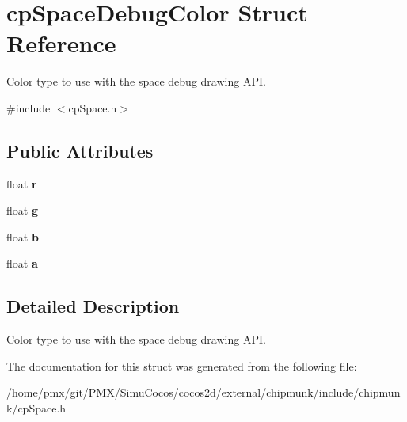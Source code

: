 \hypertarget{structcpSpaceDebugColor}{}\section{cp\+Space\+Debug\+Color Struct Reference}
\label{structcpSpaceDebugColor}


Color type to use with the space debug drawing A\+PI.  




{\ttfamily \#include $<$cp\+Space.\+h$>$}

\subsection*{Public Attributes}
\begin{DoxyCompactItemize}
\item 
\mbox{\label{structcpSpaceDebugColor_a8363abb3839ece1a2ea672e15054c31d}} 
float {\bfseries r}
\item 
\mbox{\label{structcpSpaceDebugColor_a842d9ced4b2d71df6de850c5c6580ef0}} 
float {\bfseries g}
\item 
\mbox{\label{structcpSpaceDebugColor_a4580b42ba3db2e7d945c224920ab8526}} 
float {\bfseries b}
\item 
\mbox{\label{structcpSpaceDebugColor_a9abbf5d9f4e3df34653ab5fc438e3b62}} 
float {\bfseries a}
\end{DoxyCompactItemize}


\subsection{Detailed Description}
Color type to use with the space debug drawing A\+PI. 

The documentation for this struct was generated from the following file\+:\begin{DoxyCompactItemize}
\item 
/home/pmx/git/\+P\+M\+X/\+Simu\+Cocos/cocos2d/external/chipmunk/include/chipmunk/cp\+Space.\+h\end{DoxyCompactItemize}
